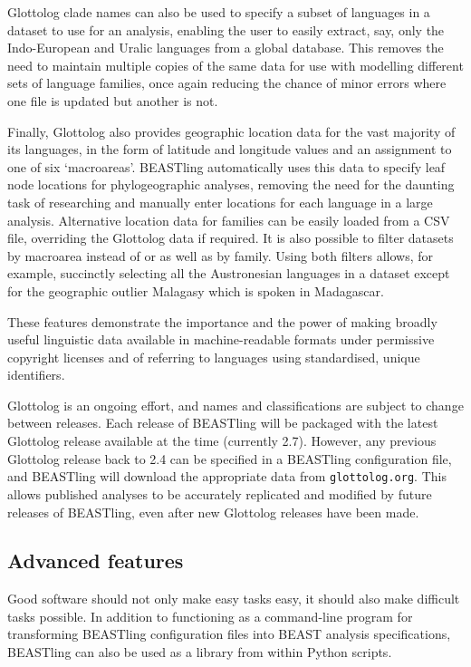 \documentclass[twocolumn,10pt]{scrartcl}
\begin{document}
Glottolog clade names can also be used to specify a subset of languages in a dataset to use for an analysis, enabling the user to easily extract, say, only the Indo-European and Uralic languages from a global database.  This removes the need to maintain multiple copies of the same data for use with modelling different sets of language families, once again reducing the chance of minor errors where one file is updated but another is not.

Finally, Glottolog also provides geographic location data for the vast majority of its languages, in the form of latitude and longitude values and an assignment to one of six `macroareas'\cite{Hammarstroem2014}.  BEASTling automatically uses this data to specify leaf node locations for phylogeographic analyses, removing the need for the daunting task of researching and manually enter locations for each language in a large analysis.  Alternative location data for families can be easily loaded from a CSV file, overriding the Glottolog data if required.  It is also possible to filter datasets by macroarea instead of or as well as by family.  Using both filters allows, for example, succinctly selecting all the Austronesian languages in a dataset except for the geographic outlier Malagasy which is spoken in Madagascar.

These features demonstrate the importance and the power of making broadly useful linguistic data available in machine-readable formats under permissive copyright licenses and of referring to languages using standardised, unique identifiers.

Glottolog is an ongoing effort, and names and classifications are subject to change between releases.  Each release of BEASTling will be packaged with the latest Glottolog release available at the time (currently 2.7).  However, any previous Glottolog release back to 2.4 can be specified in a BEASTling configuration file, and BEASTling will download the appropriate data from \texttt{glottolog.org}.  This allows published analyses to be accurately replicated and modified by future releases of BEASTling, even after new Glottolog releases have been made.

\subsection{Advanced features}

Good software should not only make easy tasks easy, it should also make difficult tasks possible.  In addition to functioning as a command-line program for transforming BEASTling configuration files into BEAST analysis specifications, BEASTling can also be used as a library from within Python scripts.
\end{document}
